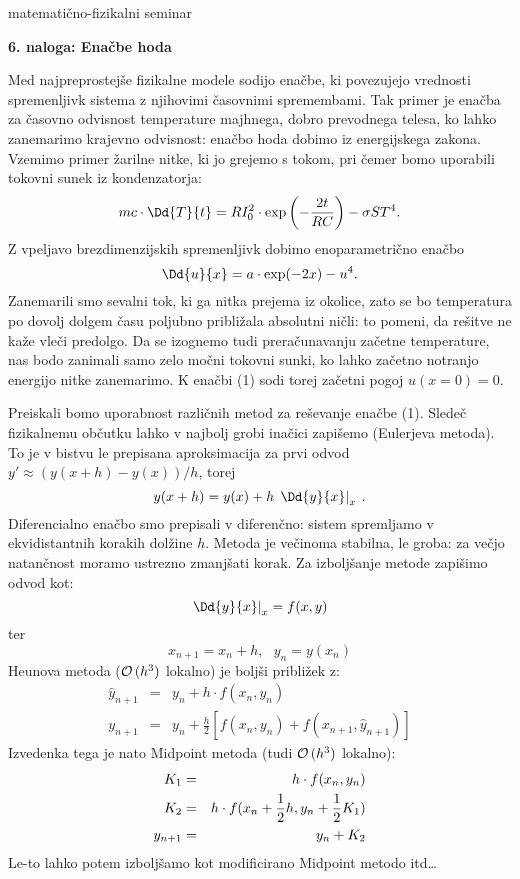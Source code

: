 \documentclass[12pt]{article}
\begin{document}
\thispagestyle{empty}


\setcounter{equation}{0}
\centerline{\sc matematično-fizikalni seminar \thisyear}
\bigskip
\setcounter{equation}{0}
\centerline{\bf 6. naloga: Enačbe hoda}
\bigskip
\bigskip

Med najpreprostejše fizikalne modele sodijo enačbe, ki
povezujejo vrednosti spremenljivk sistema z njihovimi časovnimi
spremembami. Tak primer je enačba za časovno odvisnost
temperature majhnega, dobro prevodnega telesa, ko lahko zanemarimo
krajevno odvisnost: enačbo hoda dobimo iz energijskega zakona.
Vzemimo primer žarilne nitke, ki jo grejemo s tokom, pri čemer bomo
uporabili tokovni sunek iz kondenzatorja:
\[
mc \cdot \Dd{T}{t} =
R I_0^2 \cdot {\rm exp}\left(-\frac{2t}{RC}\right) -
\sigma S T^4.
\]
Z vpeljavo brezdimenzijskih spremenljivk dobimo enoparametrično
enačbo
\begin{equation}
\Dd{u}{x} = a\cdot {\rm exp}(-2x) - u^4.
\end{equation}
Zanemarili smo sevalni tok, ki ga nitka prejema iz okolice, zato
se bo temperatura po dovolj dolgem času poljubno približala
absolutni ničli: to pomeni, da rešitve ne kaže vleči predolgo.
Da se izognemo tudi preračunavanju začetne temperature, nas bodo
zanimali samo zelo močni tokovni sunki, ko lahko začetno
notranjo energijo nitke zanemarimo. K enačbi (1) sodi torej
začetni pogoj $u(x=0) = 0$.

Preiskali bomo uporabnost različnih metod za reševanje enačbe
(1). Sledeč fizikalnemu občutku lahko v najbolj grobi inačici
zapišemo (Eulerjeva metoda). To je v bistvu le prepisana aproksimacija za prvi odvod
$y' \approx (y(x+h) - y(x)) / h$, torej
\begin{equation}
y(x+h) = y(x) + h\,\left.\Dd{y}{x}\right|_x \>.
\label{euler}
\end{equation}
Diferencialno enačbo smo prepisali v diferenčno: sistem
spremljamo v ekvidistantnih korakih dolžine $h$. Metoda je
večinoma stabilna, le groba: za večjo natančnost moramo
ustrezno zmanjšati korak.
Za izboljšanje metode zapišimo odvod kot:
$$ \left.\Dd{y}{x}\right|_x = f(x,y) $$ ter $$ x_{n+1} = x_n + h,
~~~ y_n = y(x_n)$$
Heunova metoda (${\cal O}\,(h^3 )$ lokalno) je boljši približek z:
\begin{eqnarray}
\hat{y}_{n+1} & =  & y_n +  h \cdot f(x_n,y_n) \\
y_{n+1} & = & y_n + \frac{h}{2} \left[ f(x_n,y_n) + f(x_{n+1},\hat{y}_{n+1})\right]
\end{eqnarray}
Izvedenka tega je nato Midpoint metoda (tudi ${\cal O}\,(h^3 )$ lokalno):
\begin{eqnarray}
K_1 & = & h \cdot f(x_n,y_n) \\
K_2 & = & h \cdot f(x_n+{1 \over 2}h,y_n+{1 \over 2}K_1) \\
y_{n+1} & = & y_n + K_2
\end{eqnarray}
Le-to lahko potem izboljšamo kot modificirano Midpoint metodo
itd\ldots
\end{document}
